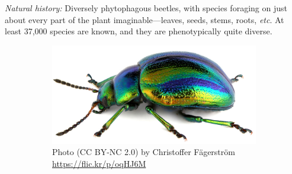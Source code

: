 \documentclass[letterpaper, 11pt]{article}
\begin{document}
\noindent{}\textit{Natural history:} Diversely phytophagous beetles, with species foraging on just about every part of the plant imaginable---leaves, seeds, stems, roots, \textit{etc}. At least 37,000 species are known, and they are phenotypically quite diverse.\\

\begin{figure}[ht!]
  \centering
\begin{subfigure}[ht!]{0.5\textwidth}
    \includegraphics[width=\textwidth]{Chrysomelid1}
  \caption{Photo (CC BY-NC 2.0) by Christoffer F\"{a}gerstr\"{o}m  \url{https://flic.kr/p/oqHJ6M}}
  \label{fig:chrysomelid1}
\end{subfigure}
    ~
 \begin{subfigure}[ht!]{0.22\textwidth}

\end{subfigure}
\end{figure}
\end{document}
